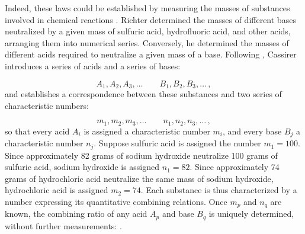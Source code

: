 \documentclass[submitted,12pt]{article}
\renewcommand{\SF}[2]{\citep[#1/#2]{Cassirer1910}}
\begin{document}
Indeed, these laws could be established by measuring the masses of substances involved in chemical reactions  \SF{273}{205}. Richter determined the masses of different bases neutralized by a given mass of sulfuric acid, hydrofluoric acid, and other acids, arranging them into numerical series. Conversely, he determined the masses of different acids required to neutralize a given mass of a base. Following \citet[71]{Duhem1902}, Cassirer introduces a series of acids and a series of bases:

\begin{equation*}
A_1, A_2, A_3, \ldots \qquad B_1, B_2, B_3, \ldots\,,
\end{equation*}
%
and establishes a correspondence between these substances and two series of characteristic numbers:

\begin{equation*}
m_1, m_2, m_3, \ldots \qquad n_1, n_2, n_3, \ldots\,,
\end{equation*}
%
so that every acid $A_i$ is assigned a characteristic number $m_i$, and every base $B_j$ a characteristic number $n_j$. Suppose sulfuric acid is assigned the number $m_1=100$. Since approximately 82 grams of sodium hydroxide neutralize 100 grams of sulfuric acid, sodium hydroxide is assigned $n_1=82$. Since approximately 74 grams of hydrochloric acid neutralize the same mass of sodium hydroxide, hydrochloric acid is assigned $m_2=74$. Each substance is thus characterized by a number expressing its quantitative combining relations. Once $m_p$ and $n_q$ are known, the combining ratio of any acid $A_p$ and base $B_q$ is uniquely determined, without further measurements:  \SF{273}{205}.
\end{document}
